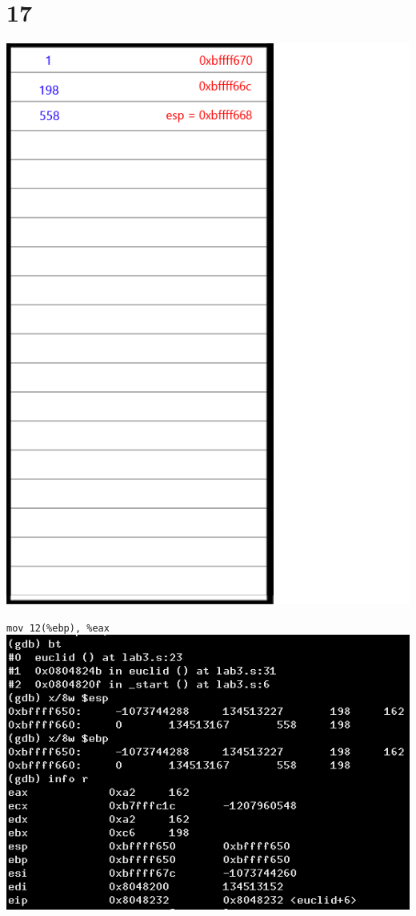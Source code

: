\documentclass{article}
\begin{document}
\section*{17}
\begin{minipage}{5cm}
\includegraphics[scale=0.3]{s3.png}
\end{minipage}
\begin{minipage}{8cm}
\verb|mov 12(%ebp), %eax|\\
\includegraphics[scale=0.4]{bxi17.png} \\
\end{minipage}
\clearpage
\end{document}
